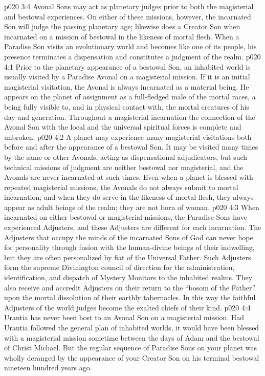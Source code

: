 \vs p020 3:4 Avonal Sons may act as planetary judges prior to both the magisterial and bestowal experiences. On either of these missions, however, the incarnated Son will judge the passing planetary age; likewise does a Creator Son when incarnated on a mission of bestowal in the likeness of mortal flesh. When a Paradise Son visits an evolutionary world and becomes like one of its people, his presence terminates a dispensation and constitutes a judgment of the realm.
\vs p020 4:1 Prior to the planetary appearance of a bestowal Son, an inhabited world is usually visited by a Paradise Avonal on a magisterial mission. If it is an initial magisterial visitation, the Avonal is always incarnated as a material being. He appears on the planet of assignment as a full\hyp{}fledged male of the mortal races, a being fully visible to, and in physical contact with, the mortal creatures of his day and generation. Throughout a magisterial incarnation the connection of the Avonal Son with the local and the universal spiritual forces is complete and unbroken.
\vs p020 4:2 A planet may experience many magisterial visitations both before and after the appearance of a bestowal Son. It may be visited many times by the same or other Avonals, acting as dispensational adjudicators, but such technical missions of judgment are neither bestowal nor magisterial, and the Avonals are never incarnated at such times. Even when a planet is blessed with repeated magisterial missions, the Avonals do not always submit to mortal incarnation; and when they do serve in the likeness of mortal flesh, they always appear as adult beings of the realm; they are not born of woman.
\vs p020 4:3 When incarnated on either bestowal or magisterial missions, the Paradise Sons have experienced Adjusters, and these Adjusters are different for each incarnation. The Adjusters that occupy the minds of the incarnated Sons of God can never hope for personality through fusion with the human\hyp{}divine beings of their indwelling, but they are often personalized by fiat of the Universal Father. Such Adjusters form the supreme Divinington council of direction for the administration, identification, and dispatch of Mystery Monitors to the inhabited realms. They also receive and accredit Adjusters on their return to the “bosom of the Father” upon the mortal dissolution of their earthly tabernacles. In this way the faithful Adjusters of the world judges become the exalted chiefs of their kind.\plusone
\pc \vs p020 4:4 Urantia has never been host to an Avonal Son on a magisterial mission. Had Urantia followed the general plan of inhabited worlds, it would have been blessed with a magisterial mission sometime between the days of Adam and the bestowal of Christ Michael. But the regular sequence of Paradise Sons on your planet was wholly deranged by the appearance of your Creator Son on his terminal bestowal nineteen hundred years ago.
